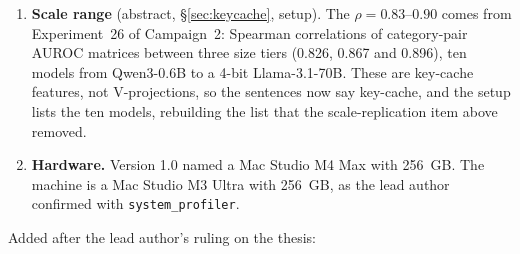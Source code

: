\documentclass[11pt,a4paper]{article}
\begin{document}
\begin{enumerate}[nosep,leftmargin=*,resume]
  \S\ref{sec:intro}, \S\ref{sec:opacity}). The headline discrimination is
  AUROC 0.620 with permutation $p = 0.023$. The abstract gives the AUROCs
  without calling them reliable, \S\ref{sec:keycache} says modestly above
  chance and gives the $p$, and four other sentences no longer say the
  features discriminate or measure state reliably.
\item \textbf{Scale range} (abstract, \S\ref{sec:keycache}, setup). The
  $\rho = 0.83$--$0.90$ comes from Experiment~26 of Campaign~2: Spearman
  correlations of category-pair AUROC matrices between three size tiers
  (0.826, 0.867 and 0.896), ten models from Qwen3-0.6B to a 4-bit
  Llama-3.1-70B. These are key-cache features, not V-projections, so the
  sentences now say key-cache, and the setup lists the ten models, rebuilding
  the list that the scale-replication item above removed.
\item \textbf{Hardware.} Version 1.0 named a Mac Studio M4 Max with 256~GB.
  The machine is a Mac Studio M3 Ultra with 256~GB, as the lead author
  confirmed with \texttt{system\_profiler}.
\end{enumerate}

\noindent Added after the lead author's ruling on the thesis:
\end{document}
